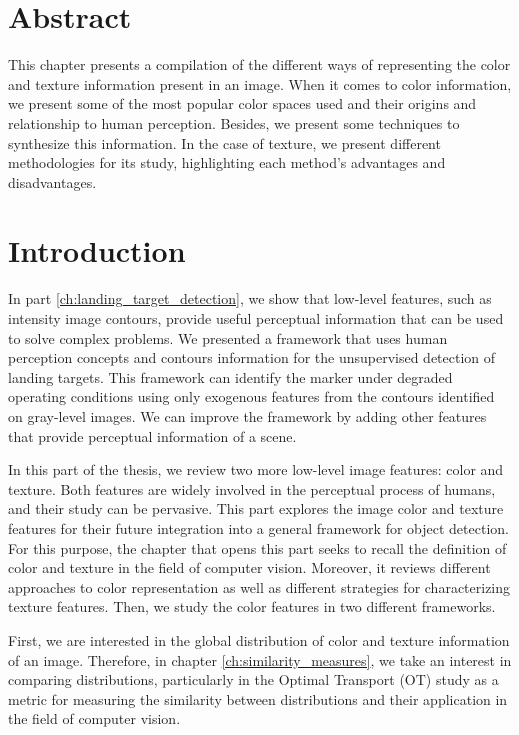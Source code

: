 \section*{Abstract}
\noindent 
This chapter presents a compilation of the different ways of representing the color and texture information present in an image. When it comes to color information, we present some of the most popular color spaces used and their origins and relationship to human perception. Besides, we present some techniques to synthesize this information. In the case of texture, we present different methodologies for its study, highlighting each method's advantages and disadvantages.

\section{Introduction}
In part \ref{ch:landing_target_detection}, we show that low-level features, such as intensity image contours, provide useful perceptual information that can be used to solve complex problems. We presented a framework that uses human perception concepts and contours information for the unsupervised detection of landing targets. This framework can identify the marker under degraded operating conditions using only exogenous features from the contours identified on gray-level images. We can improve the framework by adding other features that provide perceptual information of a scene.

In this part of the thesis, we review two more low-level image features: color and texture. Both features are widely involved in the perceptual process of humans, and their study can be pervasive. This part explores the image color and texture features for their future integration into a general framework for object detection. For this purpose, the chapter that opens this part seeks to recall the definition of color and texture in the field of computer vision. Moreover, it reviews different approaches to color representation as well as different strategies for characterizing texture features. Then, we study the color features in two different frameworks.

First, we are interested in the global distribution of color and texture information of an image. Therefore, in chapter \ref{ch:similarity_measures}, we take an interest in comparing distributions, particularly in the Optimal Transport (OT) study as a metric for measuring the similarity between distributions and their application in the field of computer vision.

